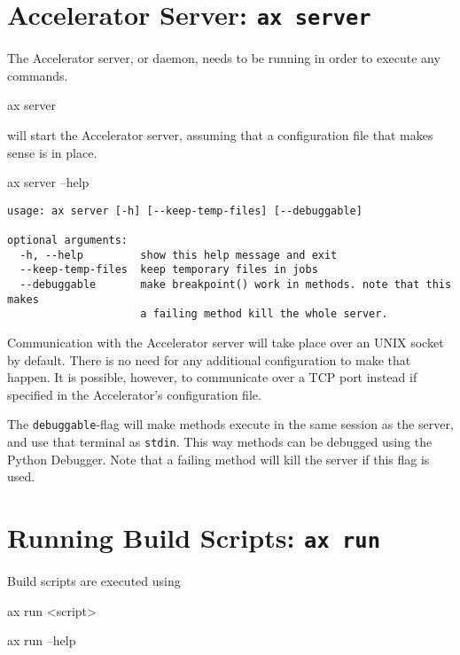 \section{Accelerator Server: \texttt{ax server}}
\label{sec:axserver}
The Accelerator server, or daemon, needs to be running in order to
execute any commands.
\begin{shell}
ax server
\end{shell}
will start the Accelerator server, assuming that a configuration file
that makes sense is in place.
\begin{shell}
ax server --help
\end{shell}
\begin{snugshade}
\begin{verbatim}
usage: ax server [-h] [--keep-temp-files] [--debuggable]

optional arguments:
  -h, --help         show this help message and exit
  --keep-temp-files  keep temporary files in jobs
  --debuggable       make breakpoint() work in methods. note that this makes
                     a failing method kill the whole server.
\end{verbatim}%
\end{snugshade}
Communication with the Accelerator server will take place over an UNIX
socket by default.  There is no need for any additional configuration
to make that happen.  It is possible, however, to communicate over a
TCP port instead if specified in the Accelerator's configuration file.

The \texttt{debuggable}-flag will make methods execute in the same
session as the server, and use that terminal as \texttt{stdin}.  This
way methods can be debugged using the Python Debugger.  Note that a
failing method will kill the server if this flag is used.



\section{Running Build Scripts: \texttt{ax run}}
\label{sec:exec_runner}
Build scripts are executed using
\begin{python}
ax run <script>
\end{python}

\begin{python}
ax run --help
\end{python}

